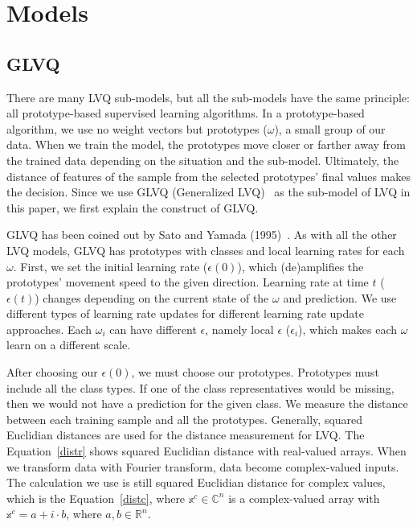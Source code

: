 \section{Models}

\subsection{GLVQ}

There are many LVQ sub-models, but all the sub-models have the same principle: all prototype-based supervised learning algorithms. In a prototype-based algorithm, we use no weight vectors but prototypes ($\omega$), a small group of our data. When we train the model, the prototypes move closer or farther away from the trained data depending on the situation and the sub-model. Ultimately, the distance of features of the sample from the selected prototypes’ final values makes the decision. Since we use GLVQ (Generalized LVQ)~\cite{sato} as the sub-model of LVQ in this paper, we first explain the construct of GLVQ.

GLVQ has been coined out by Sato and Yamada (1995)~\cite{sato}. As with all the other LVQ models, GLVQ has prototypes with classes and local learning rates for each $\omega$. First, we set the initial learning rate ($\epsilon(0)$), which (de)amplifies the prototypes’ movement speed to the given direction. Learning rate at time $t$ ($\epsilon(t)$) changes depending on the current state of the $\omega$ and prediction. We use different types of learning rate updates for different learning rate update approaches. Each $\omega_{i}$ can have different $\epsilon$, namely local $\epsilon$ ($\epsilon_{i}$), which makes each $\omega$ learn on a different scale.

After choosing our $\epsilon(0)$, we must choose our prototypes. Prototypes must include all the class types. If one of the class representatives would be missing, then we would not have a prediction for the given class. We measure the distance between each training sample and all the prototypes. Generally, squared Euclidian distances are used for the distance measurement for LVQ. The Equation~\eqref{distr} shows squared Euclidian distance with real-valued arrays. When we transform data with Fourier transform, data become complex-valued inputs. The calculation we use is still squared Euclidian distance for complex values, which is the Equation~\eqref{distc}, where $\mathbb{x}^{c}\in \mathbb{C}^{n}$ is a complex-valued array with $\mathbb{x}^{c} = a + i\cdot b$, where $a,b\in\mathbb{R}^{n}$.

